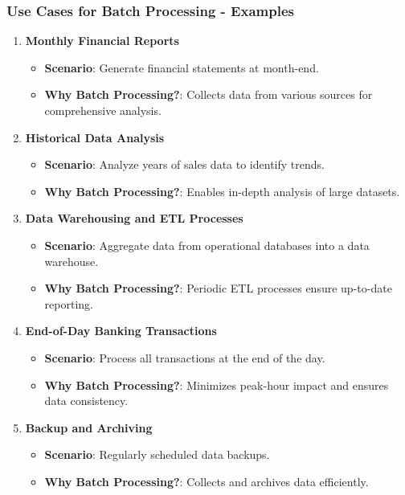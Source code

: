 \documentclass{beamer}
\begin{document}
\begin{frame}[fragile]
    \frametitle{Use Cases for Batch Processing - Examples}
    \begin{enumerate}
        \item \textbf{Monthly Financial Reports}
            \begin{itemize}
                \item \textbf{Scenario}: Generate financial statements at month-end.
                \item \textbf{Why Batch Processing?}: Collects data from various sources for comprehensive analysis.
            \end{itemize}

        \item \textbf{Historical Data Analysis}
            \begin{itemize}
                \item \textbf{Scenario}: Analyze years of sales data to identify trends.
                \item \textbf{Why Batch Processing?}: Enables in-depth analysis of large datasets.
            \end{itemize}

        \item \textbf{Data Warehousing and ETL Processes}
            \begin{itemize}
                \item \textbf{Scenario}: Aggregate data from operational databases into a data warehouse.
                \item \textbf{Why Batch Processing?}: Periodic ETL processes ensure up-to-date reporting.
            \end{itemize}

        \item \textbf{End-of-Day Banking Transactions}
            \begin{itemize}
                \item \textbf{Scenario}: Process all transactions at the end of the day.
                \item \textbf{Why Batch Processing?}: Minimizes peak-hour impact and ensures data consistency.
            \end{itemize}

        \item \textbf{Backup and Archiving}
            \begin{itemize}
                \item \textbf{Scenario}: Regularly scheduled data backups.
                \item \textbf{Why Batch Processing?}: Collects and archives data efficiently.
            \end{itemize}
    \end{enumerate}
\end{frame}
\end{document}
